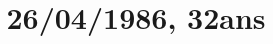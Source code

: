 \documentclass[11pt, a4paper, sans]{moderncv}
\title{26/04/1986, 32ans}
\begin{document}
\makecvtitle
\end{document}
